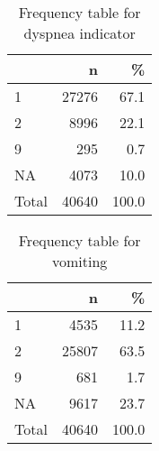 \documentclass[
]{article}
\newenvironment{Shaded}{\begin{snugshade}}{\end{snugshade}}
\newcommand{\DataTypeTok}[1]{\textcolor[rgb]{0.13,0.29,0.53}{#1}}
\newcommand{\DecValTok}[1]{\textcolor[rgb]{0.00,0.00,0.81}{#1}}
\newcommand{\KeywordTok}[1]{\textcolor[rgb]{0.13,0.29,0.53}{\textbf{#1}}}
\newcommand{\NormalTok}[1]{#1}
\newcommand{\OperatorTok}[1]{\textcolor[rgb]{0.81,0.36,0.00}{\textbf{#1}}}
\newcommand{\OtherTok}[1]{\textcolor[rgb]{0.56,0.35,0.01}{#1}}
\newcommand{\StringTok}[1]{\textcolor[rgb]{0.31,0.60,0.02}{#1}}
\begin{document}
\begin{table}[!h]

\caption{\label{tab:unnamed-chunk-58}Frequency table for dyspnea indicator}
\centering
\begin{tabular}[t]{l|r|r}
\hline
  & n & \%\\
\hline
1 & 27276 & 67.1\\
\hline
2 & 8996 & 22.1\\
\hline
9 & 295 & 0.7\\
\hline
NA & 4073 & 10.0\\
\hline
Total & 40640 & 100.0\\
\hline
\end{tabular}
\end{table}

\begin{Shaded}
\end{Shaded}

\begin{table}[!h]

\caption{\label{tab:unnamed-chunk-59}Frequency table for vomiting}
\centering
\begin{tabular}[t]{l|r|r}
\hline
  & n & \%\\
\hline
1 & 4535 & 11.2\\
\hline
2 & 25807 & 63.5\\
\hline
9 & 681 & 1.7\\
\hline
NA & 9617 & 23.7\\
\hline
Total & 40640 & 100.0\\
\hline
\end{tabular}
\end{table}
\end{document}
